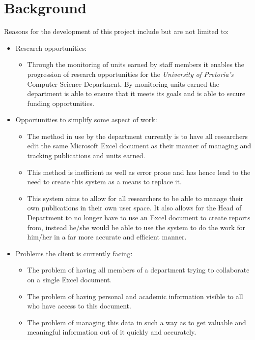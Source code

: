 \documentclass{article}
\begin{document}
	\section{Background}\label{sec:background}
		Reasons for the development of this project include but are not limited to:
		\begin{itemize}
			\item Research opportunities:
			\begin{itemize}
				\item Through the monitoring of units earned by staff members it enables the progression of research opportunities for the \textit{University of Pretoria's} Computer Science Department. By monitoring units earned the department is able to ensure that it meets its goals and is able to secure funding opportunities.
			\end{itemize}
			\item Opportunities to simplify some aspect of work:
			\begin{itemize}
				\item The method in use by the department currently is to have all researchers edit the same Microsoft Excel document as their manner of managing and tracking publications and units earned.
				\item This method is inefficient as well as error prone and has hence lead to the need to create this system as a means to replace it.
				\item This system aims to allow for all researchers to be able to manage their own publications in their own user space. It also allows for the Head of Department to no longer have to use an Excel document to create reports from, instead he/she would be able to use the system to do the work for him/her in a far more accurate and efficient manner.
			\end{itemize}
			\item Problems the client is currently facing:
			\begin{itemize}
				\item The problem of having all members of a department trying to collaborate on a single Excel document.
				\item The problem of having personal and academic information visible to all who have access to this document.
				\item The problem of managing this data in such a way as to get valuable and meaningful information out of it quickly and accurately.
			\end{itemize}
		\end{itemize}
		
\end{document}
